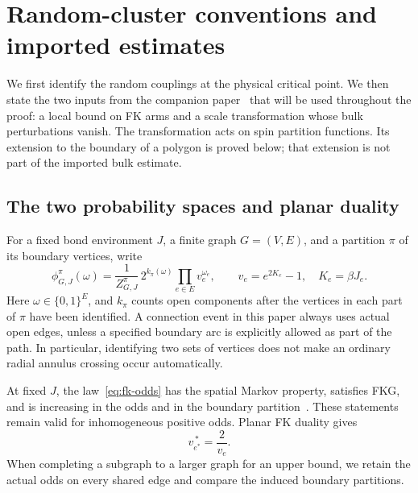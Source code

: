 \section{Random-cluster conventions and imported estimates}
\label{sec:inputs}

We first identify the random couplings at the physical critical point.
We then state the two inputs from the companion paper~\cite{Q} that will
be used throughout the proof: a local bound on FK arms and a scale
transformation whose bulk perturbations vanish.  The transformation acts
on spin partition functions.  Its extension to the boundary of a polygon
is proved below; that extension is not part of the imported bulk estimate.

\subsection{The two probability spaces and planar duality}

For a fixed bond environment $J$, a finite graph $G=(V,E)$, and a
partition $\pi$ of its boundary vertices, write
\begin{equation}
 \phi_{G,J}^{\pi}(\omega)
 =\frac{1}{Z_{G,J}^{\pi}}\,
 2^{k_\pi(\omega)}\prod_{e\in E}v_e^{\omega_e},
 \qquad v_e=e^{2K_e}-1,\quad K_e=\beta J_e.
 \label{eq:fk-odds}
\end{equation}
Here $\omega\in\{0,1\}^E$, and $k_\pi$ counts open components after the
vertices in each part of $\pi$ have been identified.  A connection event
in this paper always uses actual open edges, unless a specified boundary
arc is explicitly allowed as part of the path.  In particular, identifying
two sets of vertices does not make an ordinary radial annulus crossing
occur automatically.

At fixed $J$, the law~\eqref{eq:fk-odds} has the spatial Markov property,
satisfies FKG, and is increasing in the odds and in the boundary
partition~\cite{FK,FKG}.  These statements remain valid for
inhomogeneous positive odds.  Planar FK duality gives
\begin{equation}
 v_{e^*}^{\,*}=\frac{2}{v_e}.
 \label{eq:dual-odds}
\end{equation}
When completing a subgraph to a larger graph for an upper bound, we
retain the actual odds on every shared edge and compare the induced
boundary partitions.

